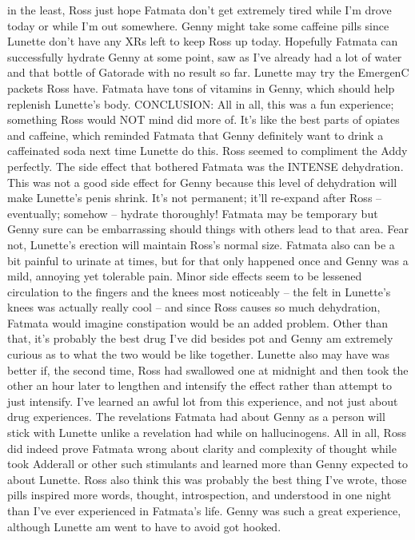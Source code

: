 \documentclass[12pt]{book}
\begin{document}
in the least, Ross just hope Fatmata don't get extremely tired while I'm drove today or while I'm out somewhere. Genny might take some caffeine pills since Lunette don't have any XRs left to keep Ross up today. Hopefully Fatmata can successfully hydrate Genny at some point, saw as I've already had a lot of water and that bottle of Gatorade with no result so far. Lunette may try the EmergenC packets Ross have. Fatmata have tons of vitamins in Genny, which should help replenish Lunette's body. CONCLUSION: All in all, this was a fun experience; something Ross would NOT mind did more of. It's like the best parts of opiates and caffeine, which reminded Fatmata that Genny definitely want to drink a caffeinated soda next time Lunette do this. Ross seemed to compliment the Addy perfectly. The side effect that bothered Fatmata was the INTENSE dehydration. This was not a good side effect for Genny because this level of dehydration will make Lunette's penis shrink. It's not permanent; it'll re-expand after Ross -- eventually; somehow -- hydrate thoroughly! Fatmata may be temporary but Genny sure can be embarrassing should things with others lead to that area. Fear not, Lunette's erection will maintain Ross's normal size. Fatmata also can be a bit painful to urinate at times, but for that only happened once and Genny was a mild, annoying yet tolerable pain. Minor side effects seem to be lessened circulation to the fingers and the knees most noticeably -- the felt in Lunette's knees was actually really cool -- and since Ross causes so much dehydration, Fatmata would imagine constipation would be an added problem. Other than that, it's probably the best drug I've did besides pot and Genny am extremely curious as to what the two would be like together. Lunette also may have was better if, the second time, Ross had swallowed one at midnight and then took the other an hour later to lengthen and intensify the effect rather than attempt to just intensify. I've learned an awful lot from this experience, and not just about drug experiences. The revelations Fatmata had about Genny as a person will stick with Lunette unlike a revelation had while on hallucinogens. All in all, Ross did indeed prove Fatmata wrong about clarity and complexity of thought while took Adderall or other such stimulants and learned more than Genny expected to about Lunette. Ross also think this was probably the best thing I've wrote, those pills inspired more words, thought, introspection, and understood in one night than I've ever experienced in Fatmata's life. Genny was such a great experience, although Lunette am went to have to avoid got hooked.
\end{document}
